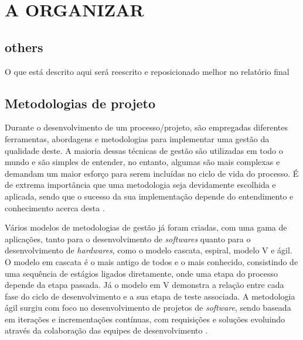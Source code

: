 \chapter{A ORGANIZAR}

\section{others}

\label{A arrumar}
O que está descrito aqui será reescrito e reposicionado melhor no relatório final


\section{Metodologias de projeto}
\label{sec:Fundamentos-Metodologias}

Durante o desenvolvimento de um processo/projeto, são empregadas diferentes ferramentas, abordagens e metodologias para implementar uma gestão da qualidade
deste. A maioria dessas técnicas de gestão são utilizadas em todo o mundo e são simples de entender, no entanto, algumas são mais complexas e demandam um 
maior esforço para serem incluídas no ciclo de vida do processo. É de extrema importância que uma metodologia seja devidamente escolhida e aplicada, 
sendo que o sucesso da sua implementação depende do entendimento e conhecimento acerca desta \cite{sokovic2010quality}.

Vários modelos de metodologias de gestão já foram criadas, com uma gama de aplicações, tanto para o desenvolvimento de \textit{softwares} quanto para o 
desenvolvimento de \textit{hardwares}, como o modelo cascata, espiral, modelo V e ágil. O modelo em cascata é o mais antigo de todos e o mais conhecido,
consistindo de uma sequência de estágios ligados diretamente, onde uma etapa do processo depende da etapa passada. Já o modelo em V demonstra a relação
entre cada fase do ciclo de desenvolvimento e a sua etapa de teste associada. A metodologia ágil surgiu com foco no desenvolvimento de projetos de 
\textit{software}, sendo baseada em iterações e incrementações contínuas, com requisições e soluções evoluindo através da colaboração das equipes
de desenvolvimento \cite{balaji2012waterfall}.

